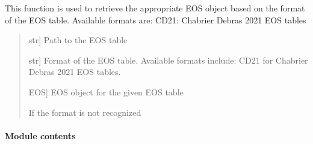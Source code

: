 \documentclass[letterpaper,10pt,english]{sphinxmanual}
\begin{document}
\begin{fulllineitems}
\label{\detokenize{CoolDwarf.EOS:CoolDwarf.EOS.EOS.get_eos}}
\pysigstartsignatures
{}
\pysigstopsignatures
\sphinxAtStartPar
This function is used to retrieve the appropriate EOS object based on the format of the EOS table.
Available formats are:
\sphinxhyphen{} CD21: Chabrier Debras 2021 EOS tables
\begin{quote}\begin{description}
\begin{description}
\sphinxlineitem{\sphinxstylestrong{path}}{[}str{]}
\sphinxAtStartPar
Path to the EOS table

\sphinxlineitem{\sphinxstylestrong{format}}{[}str{]}
\sphinxAtStartPar
Format of the EOS table. Available formats include: CD21 for Chabrier Debras 2021 EOS tables.

\end{description}

\begin{description}
\sphinxlineitem{\sphinxstylestrong{EOS}}{[}EOS{]}
\sphinxAtStartPar
EOS object for the given EOS table

\end{description}

\begin{description}
\sphinxAtStartPar
If the format is not recognized

\end{description}

\end{description}\end{quote}

\end{fulllineitems}



\paragraph{Module contents}
\label{\detokenize{CoolDwarf.EOS:module-CoolDwarf.EOS}}\label{\detokenize{CoolDwarf.EOS:module-contents}}
\sphinxstepscope
\end{document}
